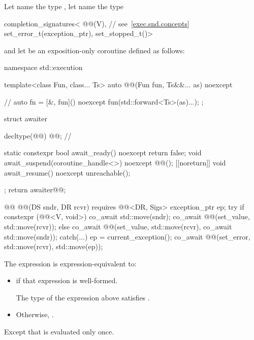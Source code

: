 \pnum
Let  name the type
,
let  name the type
\begin{codeblock}
completion_signatures<
  @@(V),         // see~\ref{exec.snd.concepts}
  set_error_t(exception_ptr),
  set_stopped_t()>
\end{codeblock}
and let  be an exposition-only coroutine
defined as follows:
\begin{codeblock}
namespace std::execution {
  template<class Fun, class... Ts>
  auto @@(Fun fun, Ts&&... as) noexcept {    // \expos
    auto fn = [&, fun]() noexcept { fun(std::forward<Ts>(as)...); };

    struct awaiter {
      decltype(@@) @@;                                     // \expos

      static constexpr bool await_ready() noexcept { return false; }
      void await_suspend(coroutine_handle<>) noexcept { @@(); }
      [[noreturn]] void await_resume() noexcept { unreachable(); }
    };
    return awaiter{@@};
  }

  @@ @@(DS sndr, DR rcvr) requires @@<DR, Sigs> {
    exception_ptr ep;
    try {
      if constexpr (@@<V, void>) {
        co_await std::move(sndr);
        co_await @@(set_value, std::move(rcvr));
      } else {
        co_await @@(set_value, std::move(rcvr), co_await std::move(sndr));
      }
    } catch(...) {
      ep = current_exception();
    }
    co_await @@(set_error, std::move(rcvr), std::move(ep));
  }
}
\end{codeblock}

\pnum
The expression  is expression-equivalent to:
\begin{itemize}
\item
{} if that expression is well-formed.

\mandates
The type of the expression above satisfies .

\item
Otherwise, .
\end{itemize}
Except that  is evaluated only once.

